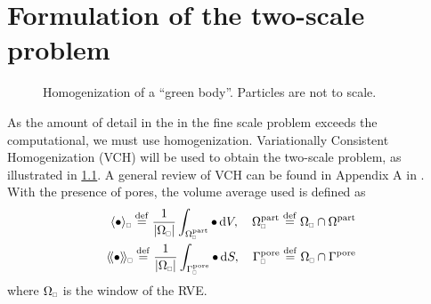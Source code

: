 \documentclass[MikaelDissertation.tex]{subfiles}
\begin{document}


\chapter{Formulation of the two-scale problem}

\begin{figure}[htpb!]
\centering
{}
\caption{Homogenization of a ``green body''. Particles are not to scale.}
\label{fig:homogenization}
\end{figure}

As the amount of detail in the in the fine scale problem exceeds the computational, we must use homogenization.
Variationally Consistent Homogenization (VCH) will be used to obtain the two-scale problem, as illustrated in \cref{fig:homogenization}.
A general review of VCH can be found in Appendix A in .
With the presence of pores, the volume average used is defined as
\begin{align}
 \homgen{\bullet} \defeq \frac{1}{\volume} \int_{\Omega_\rve^\particle} \bullet \dif V,\quad \Omega_\rve^\particle \defeq \Omega_\rve \cap \Omega^\particle
\\
 \shomgen{\bullet} \defeq \frac{1}{\volume} \int_{\Gamma^\pore_\rve} \bullet \dif S,\quad \Gamma^\pore_\rve \defeq \Omega_\rve \cap \Gamma^\pore
\end{align}
where $\Omega_\rve$ is the window of the RVE.
\end{document}
